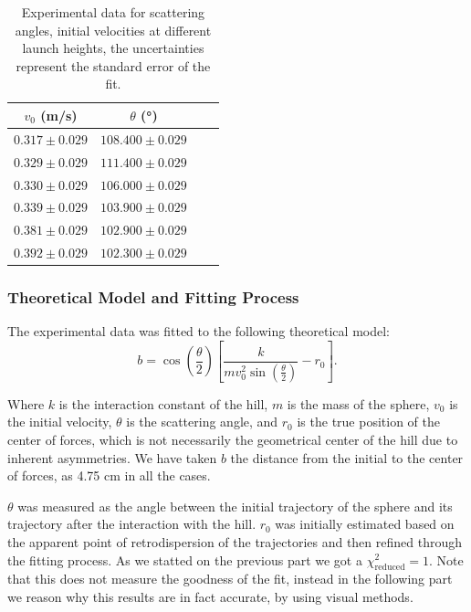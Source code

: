 \documentclass[a4paper,11pt]{article}
\begin{document}
\begin{table}[H]
    \centering
    \begin{tabular}{cccc}
        \toprule
        $v_0$ (\unit{m/s}) & $\theta$ (\unit{\degree})  \\
        \midrule
         $0.317 \pm 0.029$ & $108.400 \pm 0.029$ \\
         $0.329 \pm 0.029$ & $111.400 \pm 0.029$ \\
        $0.330 \pm 0.029$ & $106.000 \pm 0.029$ \\
        $0.339 \pm 0.029$ & $103.900 \pm 0.029$ \\
        $0.381 \pm 0.029$ & $102.900 \pm 0.029$ \\ 
        $0.392 \pm 0.029$ & $102.300 \pm 0.029$ \\
        \bottomrule
    \end{tabular}
    \caption{Experimental data for scattering angles, initial velocities at different launch heights, the uncertainties represent the standard error of the fit.}
    \label{tab:experimental_data}
\end{table}



\subsubsection{Theoretical Model and Fitting Process}
The experimental data was fitted to the following theoretical model:
\begin{equation}
    b = \cos\left(\frac{\theta}{2}\right) \left[ \frac{k}{m v_0^2 \sin\left(\frac{\theta}{2}\right)} - r_0 \right].
\end{equation}

Where $k$ is the interaction constant of the hill, $m$ is the mass of the sphere, $v_0$ is the initial velocity, $\theta$ is the scattering angle, and $r_0$ is the true position of the center of forces, which is not necessarily the geometrical center of the hill due to inherent asymmetries. 
We have taken $b$ the distance from the initial to the center of forces, as 4.75 cm in all the cases.

$\theta$ was measured as the angle between the initial trajectory of the sphere and its trajectory after the interaction with the hill. $r_0$ was initially estimated based on the apparent point of retrodispersion of the trajectories and then refined through the fitting process.
As we statted on the previous part we got a $\chi^2_{\text{reduced}} = 1$. Note that this does not measure the goodness of the fit, instead in the following part we reason why this results are in fact accurate, by using visual methods.
\end{document}
